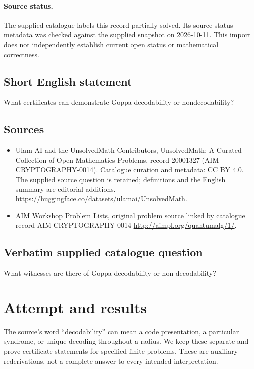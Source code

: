 \documentclass[11pt]{article}
\begin{document}
\paragraph{Source status.}
The supplied catalogue labels this record partially solved. Its source-status metadata was checked against the supplied snapshot on 2026-10-11. This import does not independently establish current open status or mathematical correctness.
\subsection{Short English statement}
What certificates can demonstrate Goppa decodability or nondecodability?
\subsection{Sources}
\begin{itemize}
\item[S1] Ulam AI and the UnsolvedMath Contributors, UnsolvedMath: A Curated Collection of Open Mathematics Problems, record 20001327 (AIM-CRYPTOGRAPHY-0014). Catalogue curation and metadata: CC BY 4.0. The supplied source question is retained; definitions and the English summary are editorial additions.
\url{https://huggingface.co/datasets/ulamai/UnsolvedMath}.
\item[S2] AIM Workshop Problem Lists, original problem source linked by catalogue record AIM-CRYPTOGRAPHY-0014
\url{http://aimpl.org/quantumalg/1/}.
\end{itemize}
\subsection{Verbatim supplied catalogue question}
What witnesses are there of Goppa decodability or non-decodability?

\section{Attempt and results}
The source's word ``decodability'' can mean a code presentation, a particular
syndrome, or unique decoding throughout a radius. We keep these separate and
prove certificate statements for specified finite problems. These are auxiliary
rederivations, not a complete answer to every intended interpretation.
\end{document}
